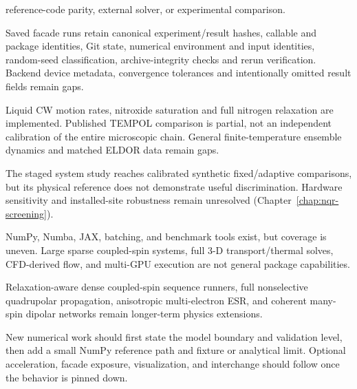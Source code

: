 \documentclass[11pt,oneside]{report}
\begin{document}
\begin{description}
  reference-code parity, external solver, or experimental comparison.
  \item[Provenance and reproducibility.] Saved facade runs retain canonical
  experiment/result hashes, callable and package identities, Git state,
  numerical environment and input identities, random-seed classification,
  archive-integrity checks and rerun verification. Backend device metadata,
  convergence tolerances and intentionally omitted result fields remain gaps.
  \item[Overhauser DNP.] Liquid CW motion rates, nitroxide saturation and full
  nitrogen relaxation are implemented. Published TEMPOL comparison is partial,
  not an independent calibration of the entire microscopic chain. General
  finite-temperature ensemble dynamics and matched ELDOR data remain gaps.
  \item[NQR screening.] The staged system study reaches calibrated synthetic
  fixed/adaptive comparisons, but its physical reference does not demonstrate
  useful discrimination. Hardware sensitivity and installed-site robustness
  remain unresolved (Chapter~\ref{chap:nqr-screening}).
  \item[Performance and scale.] NumPy, Numba, JAX, batching, and benchmark tools
  exist, but coverage is uneven. Large sparse coupled-spin systems, full 3-D
  transport/thermal solves, CFD-derived flow, and multi-GPU execution are not
  general package capabilities.
  \item[Scientific scope.] Relaxation-aware dense coupled-spin sequence runners,
  full nonselective quadrupolar propagation, anisotropic multi-electron ESR, and
  coherent many-spin dipolar networks remain longer-term physics extensions.
\end{description}

New numerical work should first state the model boundary and validation level,
then add a small NumPy reference path and fixture or analytical limit. Optional
acceleration, facade exposure, visualization, and interchange should follow once
the behavior is pinned down.
\end{document}

